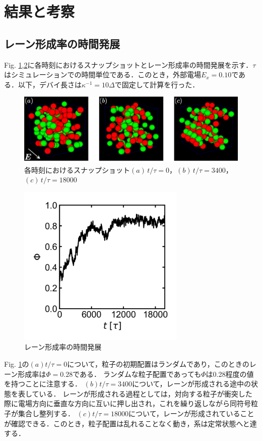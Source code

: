 \section{\large 結果と考察}
\subsection{レーン形成率の時間発展}
\par Fig. \ref{snapshot1},\ref{tvsphi}に各時刻におけるスナップショットとレーン形成率の時間発展を示す．$\tau$はシミュレーションでの時間単位である．このとき，外部電場$E_x=0.10$である．以下，デバイ長さは$\kappa^{-1}=10\Delta$で固定して計算を行った．
\begin{figure}[H]
\centering
\includegraphics[scale = 0.5]{figures/snap1.pdf}
\caption{各時刻におけるスナップショット$(a)\, t/\tau=0$，$(b)\, t/\tau=3400$，$(c)\, t/\tau=18000$}
\label{snapshot1}
\end{figure}
%
%
\begin{figure}[H]
\centering
\includegraphics[width=8.0cm]{figures/tvsphi.pdf}
\caption{レーン形成率の時間発展}
\label{tvsphi}
\end{figure}
%
\noindent
Fig. \ref{snapshot1}の$(a)t/\tau=0$について，粒子の初期配置はランダムであり，このときのレーン形成率は$\Phi=0.28$である．
ランダムな粒子配置であっても$\Phi$は0.28程度の値を持つことに注意する．
$(b)t/\tau=3400$について，レーンが形成される途中の状態を表している．
レーンが形成される過程としては，対向する粒子が衝突した際に電場方向に垂直な方向に互いに押し出され，これを繰り返しながら同符号粒子が集合し整列する．
$(c)t/\tau=18000$について，レーンが形成されていることが確認できる．このとき，粒子配置は乱れることなく動き，系は定常状態へと達する．
